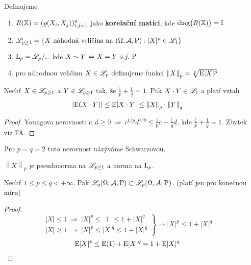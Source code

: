\begin{define}
	Definujeme 
	\begin{enumerate}
		\item $R(\mathbb{X})=(\varrho(X_i,X_j))_{i,j=1}^n$ jako \textbf{korelační matici}, kde $\mathop{\mathrm{diag}}\bigl(R(\mathbb{X})\bigr)=\mathbb{I}$
		\item $\mathscr{L}_{p\geq 1}=\{ X\text{ náhodná veličina na }(\Omega,\mathcal{A},\mathrm{P}): |X|^p\in\mathscr{L}_1 \}$
		\item $\mathrm{L}_p=\mathscr{L}_p/_\sim$ kde $X\sim Y \Leftrightarrow X=Y~s.j.~\mathrm{P}$  
		\item pro náhodnou veličinu $X\in\mathscr{L}_p$ definujeme funkci $\left\| X \right\|_p=\sqrt[p]{\mathrm{E} |X|^p}$
	\end{enumerate}

\end{define}
\begin{theorem}
	Nechť $X\in\mathscr{L}_{p\geq 1}$ a $Y\in\mathscr{L}_{q\geq 1}$ tak, že $\frac{1}{p}+\frac{1}{q}=1$. Pak $X\cdot Y \in\mathscr{L}_1$ a platí vztah 
	$$ |\mathrm{E} (X\cdot Y)|\leq \mathrm{E} |X\cdot Y|\leq \left\|X\right\|_p\cdot \left\|Y\right\|_q  $$
	\begin{proof}
			Youngova nerovnost: $ c,d\geq 0~\Rightarrow~ c^{1/p}d^{1/q}\leq \frac{1}{p}c+\frac{1}{q}d $, kde $\frac{1}{p}+\frac{1}{q}=1$. Zbytek viz FA.
		
	\end{proof}
\end{theorem}
\begin{remark}
	Pro $p=q=2$ tuto nerovnost názýváme Schwarzovou.
\end{remark}
\begin{dusl}
	$\left\| X\right\|_p$ je pseudonorma na $\mathscr{L}_{p\geq 1}$ a norma na $\mathrm{L}_p$.
\end{dusl}
\begin{theorem}
	Nechť $1\leq p\leq q< +\infty$. Pak $\mathscr{L}_q(\Omega,\mathcal{A},\mathrm{P})\subset \mathscr{L}_p(\Omega,\mathcal{A},\mathrm{P})$. (platí jen pro konečnou míru)
	\begin{proof}~
		$$ \left. \begin{array}{l}
	|X| \leq 1 ~\Rightarrow~ |X|^p \leq ~~1~~  \leq 1+|X|^q \\
	|X| \geq 1 ~\Rightarrow~ |X|^p \leq |X|^q  \leq 1+|X|^q 
		\end{array}  \right\}\Rightarrow |X|^p \leq 1+|X|^q  $$
		$$ \mathrm{E} |X|^p\leq \mathrm{E} (1)+ \mathrm{E} |X|^q=1+ \mathrm{E} |X|^q $$
	\end{proof}
\end{theorem}
